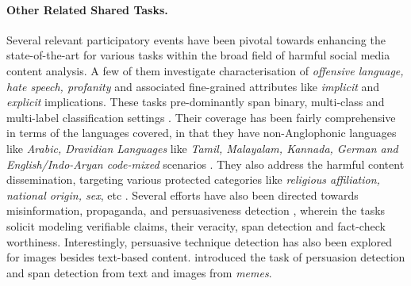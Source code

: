 \documentclass[11pt]{article}
\begin{document}
\paragraph{\bf Other Related Shared Tasks.}
Several relevant participatory events have been pivotal towards enhancing the state-of-the-art for various tasks within the broad field of harmful social media content analysis. A few of them investigate characterisation of \textit{offensive language, hate speech, profanity} and associated fine-grained attributes like \textit{implicit} and \textit{explicit} implications. These tasks pre-dominantly span binary, multi-class and multi-label classification settings \cite{mubarak-etal-2020-overview,StrussSiegelRuppenhoferetal2019}. Their coverage has been fairly comprehensive in terms of the languages covered, in that they have non-Anglophonic languages like \textit{Arabic, Dravidian Languages} like \textit{Tamil, Malayalam, Kannada, German and English/Indo-Aryan code-mixed} scenarios \cite{mubarak-etal-2020-overview,chakravarthi-etal-2021-findings-shared,hasoc2021}. They also address the harmful content dissemination, targeting various protected categories like \textit{religious affiliation, national origin, sex}, etc \cite{zhang-etal-2019-grunn2019}.
Several efforts have also been directed towards misinformation, propaganda, and persuasiveness detection \cite{feverous2021,shaar-etal-2021-findings,da-san-martino-etal-2020-semeval}, wherein the tasks solicit modeling verifiable claims, their veracity, span detection and fact-check worthiness. Interestingly, persuasive technique detection has also been explored for images besides text-based content. \citet{dimitrov-etal-2021-semeval} introduced the task of persuasion detection and span detection from text and images from \textit{memes}. 
\end{document}
